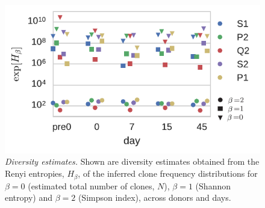 \documentclass[letterpaper,english,prl,reprint,longbibliography]{revtex4-1} %
\begin{document}
\begin{figure}[ht!]
\includegraphics{fig4_div_estimates}
\centering{}
\caption{
\emph{Diversity estimates.} Shown are diversity estimates obtained from the Renyi entropies, $H_\beta$, of the inferred clone frequency distributions for $\beta=0$ (estimated total number of clones, $N$), $\beta=1$ (Shannon entropy) and $\beta=2$ (Simpson index), across donors and days.
\label{fig:div_estimates}}
\end{figure}


\end{document}
